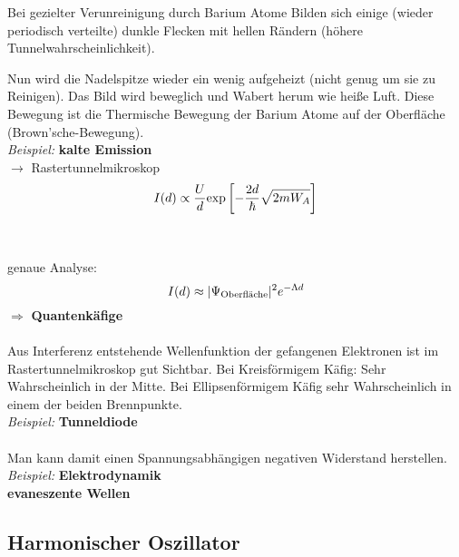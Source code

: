Bei gezielter Verunreinigung durch Barium Atome Bilden sich einige (wieder periodisch verteilte) dunkle Flecken mit hellen Rändern (höhere Tunnelwahrscheinlichkeit).

Nun wird die Nadelspitze wieder ein wenig aufgeheizt (nicht genug um sie zu Reinigen). Das Bild wird beweglich und Wabert herum wie heiße Luft. Diese Bewegung ist die Thermische Bewegung der Barium Atome auf der Oberfläche (Brown'sche-Bewegung).\\[10pt]
\emph{Beispiel:} \textbf{kalte Emission}\\[5pt]
$ \rightarrow $ Rastertunnelmikroskop
\begin{equation*}
I(d) \propto \frac{U}{d} \textrm{exp} \left[- \frac{2 d}{\hbar} \sqrt{2 m W_A}\right]
\end{equation*}
\\
\\
genaue Analyse:
\begin{equation*}
I(d) \approx | \Psi_{\textrm{Oberfläche}} |^2 e^{- \Lambda d}
\end{equation*}
$ \Rightarrow $ \textbf{Quantenkäfige}\\
\\
Aus Interferenz entstehende Wellenfunktion der gefangenen Elektronen ist im Rastertunnelmikroskop gut Sichtbar. Bei Kreisförmigem Käfig: Sehr Wahrscheinlich in der Mitte. Bei Ellipsenförmigem Käfig sehr Wahrscheinlich in einem der beiden Brennpunkte.\\[10pt]
\emph{Beispiel:} \textbf{Tunneldiode}\\[5pt]
\\
Man kann damit einen Spannungsabhängigen negativen Widerstand herstellen.\\[10pt]
\emph{Beispiel:} \textbf{Elektrodynamik}\\[5pt]
\textbf{evaneszente Wellen} 

\subsection{Harmonischer Oszillator}

